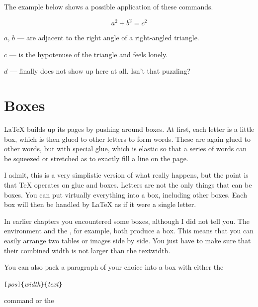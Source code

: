 \noindent The example below shows a possible application of these commands.

\begin{example}
\newenvironment{vardesc}[1]{%
  \settowidth{\parindent}{#1:\ }
  \makebox[0pt][r]{#1:\ }}{}

\begin{displaymath}
a^2+b^2=c^2
\end{displaymath}

\begin{vardesc}{Where}$a$,
$b$ --- are adjacent to the right
angle of a right-angled triangle.

$c$ --- is the hypotenuse of
the triangle and feels lonely.

$d$ --- finally does not show up
here at all. Isn't that puzzling?
\end{vardesc}
\end{example}

\section{Boxes}
\LaTeX{} builds up its pages by pushing around boxes. At first, each
letter is a little box, which is then glued to other letters to form
words. These are again glued to other words, but with special glue,
which is elastic so that a series of words can be squeezed or
stretched as to exactly fill a line on the page.

I admit, this is a very simplistic version of what really happens, but the
point is that \TeX{} operates on glue and boxes. Letters are not the only
things that can be boxes. You can put virtually everything into a box,
including other boxes. Each box will then be handled by \LaTeX{} as if it
were a single letter.

In earlier chapters you encountered some boxes, although I did
not tell you. The  environment and the , for
example, both produce a box. This means that you can easily arrange two
tables or images side by side. You just have to make sure that their
combined width is not larger than the textwidth.

You can also pack a paragraph of your choice into a box with either
the

\begin{lscommand}
  \verb|[|\emph{pos}\verb|]{|\emph{width}\verb|}{|\emph{text}\verb|}|
\end{lscommand}

\noindent command or the

